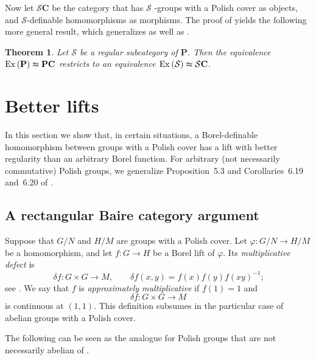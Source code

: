 \documentclass[12pt]{amsart}
\newtheorem{theorem}{Theorem}[section]
\theoremstyle{definition}
\begin{document}
Now let $\mathcal{S}\mathbf{C}$ be the category that has $\mathcal{S}$%
-groups with a Polish cover as objects, and $\mathcal{S}$-definable
homomorphisms as morphisms. The proof of  yields
the following more general result, which generalizes %
 as well as \cite[Theorem~6.14]%
{lupini_looking_2024}.

\begin{theorem}
\label{Theorem:main-completion-S} Let $\mathcal{S}$ be a regular subcategory
of $\mathbf{P}$. Then the equivalence $\mathrm{Ex}\left( \mathbf{P}\right)
\thickapprox \mathbf{PC}$ restricts to an equivalence $\mathrm{Ex}\left( 
\mathcal{S}\right) \thickapprox \mathcal{S}\mathbf{C}$.
\end{theorem}

\section{Better lifts \label{Section:better-lifts}}

In this section we show that, in certain situations, a Borel-definable
homomorphism between groups with a Polish cover has a lift with better
regularity than an arbitrary Borel function. For arbitrary (not necessarily
commutative) Polish groups, we generalize Proposition~5.3 and
Corollaries~6.19 and~6.20 of \cite{lupini_looking_2024}.

\subsection{A rectangular Baire category argument}

Suppose that $G/N$ and $H/M$ are groups with a Polish cover. Let $\varphi
:G/N\rightarrow H/M$ be a homomorphism, and let $f:G\rightarrow H$ be a
Borel lift of $\varphi $. Its \emph{multiplicative defect} is 
\begin{equation*}
\delta f:G\times G\longrightarrow M,\qquad \delta f(x,y)=f(x)f(y)f(xy)^{-1}%
\text{;}
\end{equation*}%
see \cite[Definition~5.1]{lupini_looking_2024}. We say that $f$ is \emph{%
approximately multiplicative} if $f(1)=1$ and 
\begin{equation*}
\delta f:G\times G\rightarrow M
\end{equation*}%
is continuous at $(1,1)$. This definition subsumes \cite[Definition~5.1]%
{lupini_looking_2024} in the particular case of abelian groups with a Polish
cover.

The following can be seen as the analogue for Polish groups that are not
necessarily abelian of \cite[Lemma~5.2]{lupini_looking_2024}.
\end{document}
